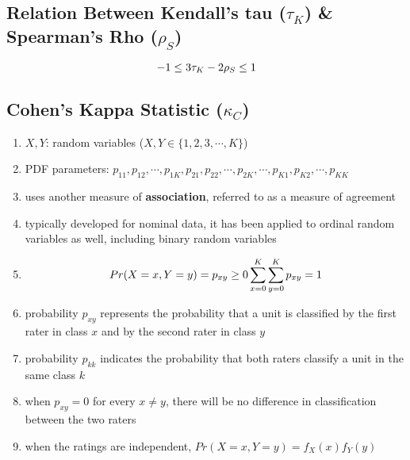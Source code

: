 \subsection{Relation Between Kendall’s tau ($\tau_K$) \& Spearman’s Rho ($\rho_S$) \cite{ism-1}}\label{Relation Between Kendall’s tau and Spearman’s Rho}

\[
    \hfill
    -1 \leq 3\tau_K - 2\rho_S \leq 1
    \hfill
\]


\subsection{Cohen’s Kappa Statistic ($\kappa_C$) \cite{ism-1}} \label{Multivariate Distributions: Cohen’s Kappa Statistic}

\begin{enumerate}
    \item[] $X, Y$: random variables ($X, Y \in \{1, 2, 3,\cdots, K\}$) 

    \item[] PDF parameters: $p_{11}, p_{12},\cdots, p_{1K}, p_{21}, p_{22},\cdots, p_{2K},\cdots, p_{K1}, p_{K2},\cdots, p_{KK}$ 
    
    \item uses another measure of \textbf{association}, referred to as a measure of agreement

    \item typically developed for nominal data, it has been applied to ordinal random variables as well, including binary random variables

    \item[] \[
        \hfill
        Pr(X=x,Y=y) = p_{xy} \geq 0
        \hfill
        \dsum_{x=0}^K \dsum_{y=0}^K p_{xy} = 1
        \hfill
    \] 

    \item probability $p_{xy}$ represents the probability that a unit is classified by the first rater in class $x$ and by the second rater in class $y$

    \item probability $p_{kk}$ indicates the probability that both raters classify a unit in the same class $k$

    \item when $p_{xy} = 0$ for every $x \neq y$, there will be no difference in classification between the two raters

    \item when the ratings are independent, $Pr(X = x, Y = y) = f_X(x)f_Y(y)$


\end{enumerate}
